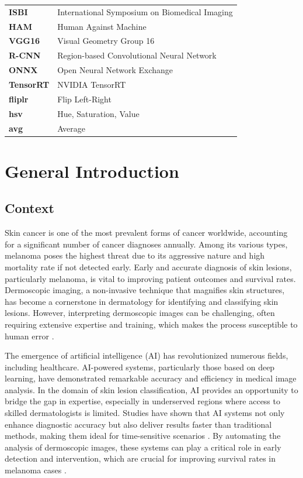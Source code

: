 \documentclass[a4paper,12pt]{report}
\begin{document}
\begin{spacing}{1.5}
\begin{tabular}{ll}
\textbf{ISBI}    & International Symposium on Biomedical Imaging \\
\textbf{HAM}     & Human Against Machine \\
\textbf{VGG16}   & Visual Geometry Group 16 \\
\textbf{R-CNN}   & Region-based Convolutional Neural Network \\
\textbf{ONNX}    & Open Neural Network Exchange \\
\textbf{TensorRT} & NVIDIA TensorRT \\
\textbf{fliplr} & Flip Left-Right \\
\textbf{hsv} & Hue, Saturation, Value \\
\textbf{avg} & Average \\
\end{tabular}

\newpage

\chapter{General Introduction}
    \section{Context}
    Skin cancer is one of the most prevalent forms of cancer worldwide, accounting for a significant number of cancer diagnoses annually. Among its various types, melanoma poses the highest threat due to its aggressive nature and high mortality rate if not detected early. Early and accurate diagnosis of skin lesions, particularly melanoma, is vital to improving patient outcomes and survival rates. Dermoscopic imaging, a non-invasive technique that magnifies skin structures, has become a cornerstone in dermatology for identifying and classifying skin lesions. However, interpreting dermoscopic images can be challenging, often requiring extensive expertise and training, which makes the process susceptible to human error \cite{intro1}.

    The emergence of artificial intelligence (AI) has revolutionized numerous fields, including healthcare. AI-powered systems, particularly those based on deep learning, have demonstrated remarkable accuracy and efficiency in medical image analysis. In the domain of skin lesion classification, AI provides an opportunity to bridge the gap in expertise, especially in underserved regions where access to skilled dermatologists is limited. Studies have shown that AI systems not only enhance diagnostic accuracy but also deliver results faster than traditional methods, making them ideal for time-sensitive scenarios \cite{intro2}. By automating the analysis of dermoscopic images, these systems can play a critical role in early detection and intervention, which are crucial for improving survival rates in melanoma cases \cite{intro3}.
    

\end{spacing}
\end{document}
